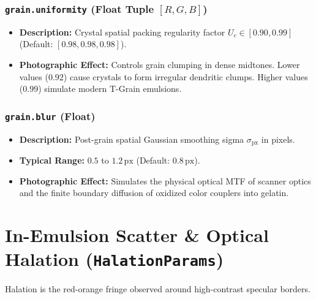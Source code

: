 \documentclass[11pt,a4paper]{article}
\begin{document}
\subsubsection{\texttt{grain.uniformity} (Float Tuple $[R, G, B]$)}
\begin{itemize}[leftmargin=*]
    \item \textbf{Description:} Crystal spatial packing regularity factor $U_c \in [0.90, 0.99]$ (Default: $[0.98, 0.98, 0.98]$).
    \item \textbf{Photographic Effect:} Controls grain clumping in dense midtones. Lower values ($0.92$) cause crystals to form irregular dendritic clumps. Higher values ($0.99$) simulate modern T-Grain emulsions.
\end{itemize}

\subsubsection{\texttt{grain.blur} (Float)}
\begin{itemize}[leftmargin=*]
    \item \textbf{Description:} Post-grain spatial Gaussian smoothing sigma $\sigma_{\text{px}}$ in pixels.
    \item \textbf{Typical Range:} $0.5$ to $1.2\,\text{px}$ (Default: $0.8\,\text{px}$).
    \item \textbf{Photographic Effect:} Simulates the physical optical MTF of scanner optics and the finite boundary diffusion of oxidized color couplers into gelatin.
\end{itemize}

\newpage

\section{In-Emulsion Scatter \& Optical Halation (\texttt{HalationParams})}

Halation is the red-orange fringe observed around high-contrast specular borders.
\end{document}
